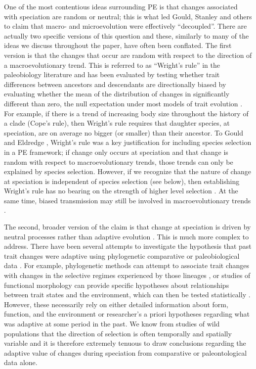 One of the most contentious ideas surrounding PE is that changes associated with speciation are random or neutral; this is what led Gould, Stanley and others to claim that macro- and microevolution were effectively ``decoupled''. There are actually two specific versions of this question and these, similarly to many of the ideas we discuss throughout the paper, have often been conflated. The first version is that the changes that occur are random with respect to the direction of a macroevolutionary trend. This is referred to as ``Wright's rule'' in the paleobiology literature \citep{GouldEldredge1977} and has been evaluated by testing whether trait differences between ancestors and descendants are directionally biased by evaluating whether the mean of the distribution of changes in significantly different than zero, the null expectation under most models of trait evolution \citep{Wagner1996, Wagner2001}. For example, if there is a trend of increasing body size throughout the history of a clade (Cope's rule), then Wright's rule requires that daughter species, at speciation, are on average no bigger (or smaller) than their ancestor. To Gould and Eldredge \citep{GouldEldredge1977} \citep[as well as to other researchers; for example,][]{Stanley1975, Stanley1979}, Wright's rule was a key justification for including species selection in a PE framework; if change only occurs at speciation and that change is random with respect to macroevolutionary trends, those trends can only be explained by species selection. However, if we recognize that the nature of change at speciation is independent of species selection (see below), then establishing Wright's rule has no bearing on the strength of higher level selection \citep{Simpson2013}. At the same time, biased transmission may still be involved in macroevolutionary trends \citep{Wagner1996, McShea1994, McShea1998}.

The second, broader version of the claim is that change at speciation is driven by neutral processes rather than adaptive evolution \citep{Stanley1979, Gould1980, Gould2002}. This is much more complex to address. There have been several attempts to investigate the hypothesis that past trait changes were adaptive using phylogenetic comparative or paleobiological data  \citep[see for example,][]{Adaptation}. For example, phylogenetic methods can attempt to associate trait changes with changes in the selective regimes experienced by those lineages \citep{Baum1991, ButlerKing2004, Beaulieu2012}, or studies of functional morphology can provide specific hypotheses about relationships between trait states and the environment, which can then be tested statistically \citep{Wainwright2007}. However, these necessarily rely on either detailed information about form, function, and the environment \citep[e.g.,][and references therein]{Vermeij1987} or researcher's a priori hypotheses regarding what was adaptive at some period in the past. We know from studies of wild populations that the direction of selection is often temporally and spatially variable \citep{Grant2002, Siepielski2009, Siepielski2011} and it is therefore extremely tenuous to draw conclusions regarding the adaptive value of changes during speciation from comparative or paleontological data alone.

